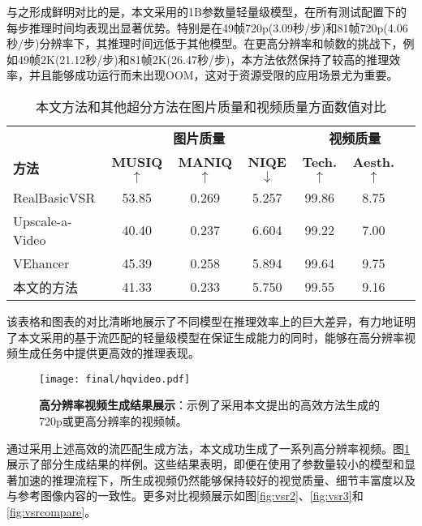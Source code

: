 与之形成鲜明对比的是，本文采用的1B参数量轻量级模型，在所有测试配置下的每步推理时间均表现出显著优势。特别是在49帧720p(3.09秒/步)和81帧720p(4.06秒/步)分辨率下，其推理时间远低于其他模型。在更高分辨率和帧数的挑战下，例如49帧2K(21.12秒/步)和81帧2K(26.47秒/步)，本方法依然保持了较高的推理效率，并且能够成功运行而未出现OOM，这对于资源受限的应用场景尤为重要。
\begin{table}[!t]
\centering
\caption{本文方法和其他超分方法在图片质量和视频质量方面数值对比}
\small
\begin{tabular}{lcccccc}
\toprule
& \multicolumn{3}{c}{\textbf{图片质量}} & \multicolumn{3}{c}{\textbf{视频质量 \cite{dover}}} \\
\cmidrule(lr){2-4} \cmidrule(lr){5-7} 
\textbf{方法} & \textbf{MUSIQ\cite{ke2021musiq}$\uparrow$} & 
\textbf{MANIQ\cite{maniqa}$\uparrow$} &
\textbf{NIQE\cite{niqe}$\downarrow$} &  
\textbf{Tech.$\uparrow$} & \textbf{Aesth.$\uparrow$} \\
\midrule
RealBasicVSR\cite{RealBasicVSR} &53.85 &0.269&5.257 &99.86& 8.75 \\
Upscale-a-Video\cite{zhou2024upscaleavideo}&40.40 &0.237 &6.604 & 99.22& 7.00\\
VEhancer\cite{he2024venhancer}&45.39 &0.258 &5.894&99.64&9.75\\
\bottomrule
本文的方法&41.33 &0.233 & 5.750&99.55&9.16 \\
\end{tabular}
\label{tab:vsr_compare}
\end{table}
该表格和图表的对比清晰地展示了不同模型在推理效率上的巨大差异，有力地证明了本文采用的基于流匹配的轻量级模型在保证生成能力的同时，能够在高分辨率视频生成任务中提供更高效的推理表现。
\begin{figure}[h]
    \centering
    \texttt{[image: final/hqvideo.pdf]}
    \caption{\textbf{高分辨率视频生成结果展示}：示例了采用本文提出的高效方法生成的720p或更高分辨率的视频帧。}
    \label{hqvideo}
\end{figure}
通过采用上述高效的流匹配生成方法，本文成功生成了一系列高分辨率视频。图\ref{hqvideo}展示了部分生成结果的样例。这些结果表明，即便在使用了参数量较小的模型和显著加速的推理流程下，所生成视频仍然能够保持较好的视觉质量、细节丰富度以及与参考图像内容的一致性。更多对比视频展示如图\ref{fig:vsr2}、\ref{fig:vsr3}和\ref{fig:vsrcompare}。

